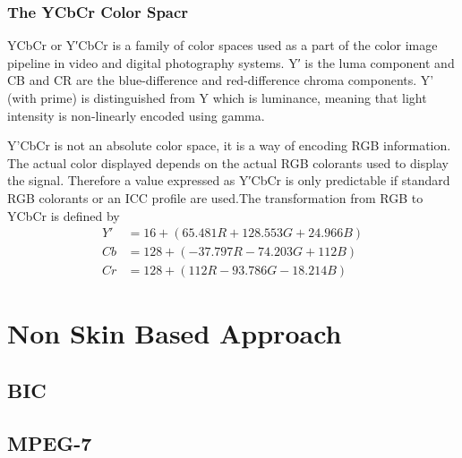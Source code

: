 \subsubsection{The YCbCr Color Spacr}
YCbCr or Y′CbCr is a family of color spaces used as a part of the color image pipeline in video and digital photography systems. Y′ is the luma component and CB and CR are the blue-difference and red-difference chroma  components. Y' (with prime) is distinguished from Y which is luminance, meaning that light intensity is non-linearly encoded using gamma.

Y'CbCr is not an absolute color space, it is a way of encoding RGB information. The actual color displayed depends on the actual RGB colorants used to display the signal. Therefore a value expressed as Y′CbCr is only predictable if standard RGB colorants or an ICC profile are used.The transformation from RGB to YCbCr is defined by
\begin{align}
Y'&=16+ (65.481R + 128.553G + 24.966B)\\
Cb&=128+(-37.797R- 74.203G +112B)\\
Cr&=128+(112R -93.786G - 18.214B)
\end{align}
%

\section {Non Skin Based Approach}


\subsection {BIC}
\clearpage
\subsection {MPEG-7}



